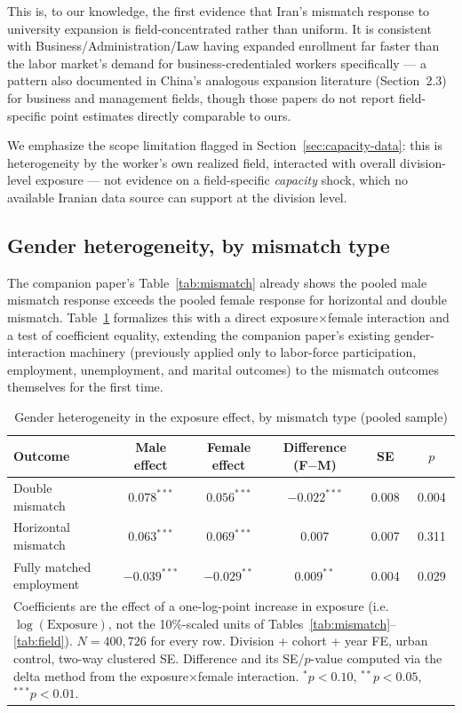 \documentclass[11pt]{article}
\begin{document}
This is, to our knowledge, the first evidence that Iran's mismatch response to university expansion is field-concentrated rather than uniform. It is consistent with Business/Administration/Law having expanded enrollment far faster than the labor market's demand for business-credentialed workers specifically --- a pattern also documented in China's analogous expansion literature (Section~2.3) for business and management fields, though those papers do not report field-specific point estimates directly comparable to ours.

We emphasize the scope limitation flagged in Section~\ref{sec:capacity-data}: this is heterogeneity by the worker's own realized field, interacted with overall division-level exposure --- not evidence on a field-specific \emph{capacity} shock, which no available Iranian data source can support at the division level.

\subsection{Gender heterogeneity, by mismatch type}
\label{sec:genderhet}

The companion paper's Table~\ref{tab:mismatch} already shows the pooled male mismatch response exceeds the pooled female response for horizontal and double mismatch. Table~\ref{tab:gender-mismatch} formalizes this with a direct exposure$\times$female interaction and a test of coefficient equality, extending the companion paper's existing gender-interaction machinery (previously applied only to labor-force participation, employment, unemployment, and marital outcomes) to the mismatch outcomes themselves for the first time.

\begin{table}[htbp]
\centering
\caption{Gender heterogeneity in the exposure effect, by mismatch type (pooled sample)}
\label{tab:gender-mismatch}
\begin{tabular}{lccccc}
\toprule
Outcome & Male effect & Female effect & Difference (F$-$M) & SE & $p$ \\
\midrule
Double mismatch          & $0.078^{***}$ & $0.056^{***}$ & $-0.022^{***}$ & 0.008 & 0.004 \\
Horizontal mismatch      & $0.063^{***}$ & $0.069^{***}$ & $0.007$        & 0.007 & 0.311 \\
Fully matched employment & $-0.039^{***}$ & $-0.029^{**}$ & $0.009^{**}$   & 0.004 & 0.029 \\
\bottomrule
\multicolumn{6}{p{0.98\textwidth}}{\footnotesize Coefficients are the effect of a one-log-point increase in exposure (i.e.\ $\log(\text{Exposure})$, not the 10\%-scaled units of Tables~\ref{tab:mismatch}--\ref{tab:field}). $N=400{,}726$ for every row. Division + cohort + year FE, urban control, two-way clustered SE. Difference and its SE/$p$-value computed via the delta method from the exposure$\times$female interaction. $^{*}p<0.10$, $^{**}p<0.05$, $^{***}p<0.01$.}
\end{tabular}
\end{table}
\end{document}
